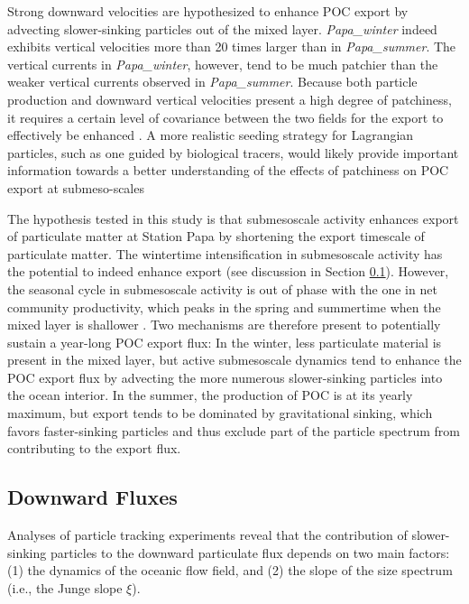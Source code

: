 \documentclass[article,linenumbers]{agujournal2019}
\begin{document}
	Strong downward velocities are hypothesized to enhance POC export by advecting slower-sinking particles out of the mixed layer. \textit{Papa\_winter} indeed exhibits vertical velocities more than 20 times larger than in \textit{Papa\_summer}. The vertical currents in \textit{Papa\_winter}, however, tend to be much patchier than the weaker vertical currents observed in \textit{Papa\_summer}. Because both particle production and downward vertical velocities present a high degree of patchiness, it requires a certain level of covariance between the two fields for the export to effectively be enhanced \cite{Mahadevan_2012}. A more realistic seeding strategy for Lagrangian particles, such as one guided by biological tracers, would likely provide important information towards a better understanding of the effects of patchiness on POC export at submeso-scales

	The hypothesis tested in this study is that submesoscale activity enhances export of particulate matter at Station Papa by shortening the export timescale of particulate matter. The wintertime intensification in submesoscale activity has the potential to indeed enhance export (see discussion in Section \ref{sec: discussion_particle}). However, the seasonal cycle in submesoscale activity is out of phase with the one in net community productivity, which peaks in the spring and summertime when the mixed layer is shallower \cite{Plant_2016}. Two mechanisms are therefore present to potentially sustain a year-long POC export flux: In the winter, less particulate material is present in the mixed layer, but active submesoscale dynamics tend to enhance the POC export flux by advecting the more numerous slower-sinking particles into the ocean interior. In the summer, the production of POC is at its yearly maximum, but export tends to be dominated by gravitational sinking, which favors faster-sinking particles and thus exclude part of the particle spectrum from contributing to the export flux.

	\subsection{Downward Fluxes}
	\label{sec: discussion_particle}

	Analyses of particle tracking experiments reveal that the contribution of slower-sinking particles to the downward particulate flux depends on two main factors: (1) the dynamics of the oceanic flow field, and (2) the slope of the size spectrum (i.e., the Junge slope $\xi$).
\end{document}
